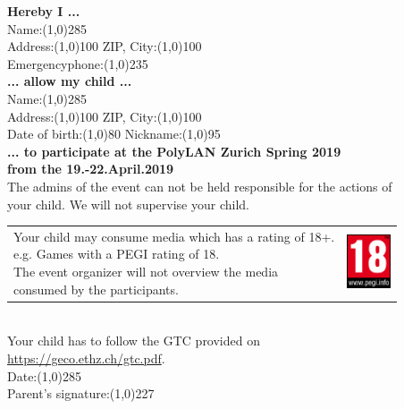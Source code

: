 \documentclass{article}
\begin{document}
\textbf{Hereby I ...}\\
\vspace{0.5cm}
Name:\line(1,0){285}\\
\vspace{0.5cm}
Address:\line(1,0){100}\hspace{1cm} ZIP, City:\line(1,0){100}\\
\vspace{0.5cm}
Emergencyphone:\line(1,0){235} \\
\vspace{0.5cm}
\textbf{... allow my child ...}\\
\vspace{0.5cm}
Name:\line(1,0){285}\\
\vspace{0.5cm}
Address:\line(1,0){100}\hspace{1cm} ZIP, City:\line(1,0){100}\\
\vspace{0.5cm}
Date of birth:\line(1,0){80}\hspace{1cm} Nickname:\line(1,0){95}\\
\vspace{0.5cm}
\textbf{... to participate at the PolyLAN Zurich Spring 2019\\from the 19.-22.April.2019}\\
\vspace{0.5cm}
The admins of the event can not be held responsible for the actions of\\your child.
We will not supervise your child.\\
\vspace{0.2cm}
\begin{tabular}{@{}l l@{}}
\shortstack[l]{Your child may consume media which has a rating of 18+. \\e.g. Games with a PEGI rating of 18.\\The event organizer will not overview the media\\ consumed by the participants.} & \includegraphics[width=1.3cm]{img/pegi18.png}
\end{tabular}
\vspace{0.5cm}
\\
Your child has to follow the GTC provided on\\\url{https://geco.ethz.ch/gtc.pdf}.
\vspace{1cm}
\\
Date:\line(1,0){285} \\
\vspace{0.5cm}
Parent's signature:\line(1,0){227} \\

\end{document}
